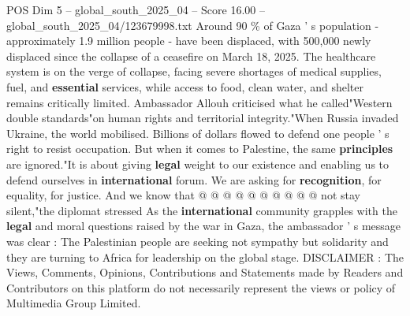 \begin{textsample}{POS Dim 5 – global\_south\_2025\_04 – Score 16.00 – global\_south\_2025\_04/123679998.txt}
Around 90 \% of Gaza ' s population - approximately 1.9 million people - have been displaced, with 500,000 newly displaced since the collapse of a ceasefire on March 18, 2025.
The healthcare system is on the verge of collapse, facing severe shortages of medical supplies, fuel, and \textbf{essential} services, while access to food, clean water, and shelter remains critically limited.
Ambassador Allouh criticised what he called"Western double standards"on human rights and territorial integrity."When Russia invaded Ukraine, the world mobilised.
Billions of dollars flowed to defend one people ' s right to resist occupation.
But when it comes to Palestine, the same \textbf{principles} are ignored."It is about giving \textbf{legal} weight to our existence and enabling us to defend ourselves in \textbf{international} forum.
We are asking for \textbf{recognition}, for equality, for justice.
And we know that @ @ @ @ @ @ @ @ @ @ not stay silent,"the diplomat stressed As the \textbf{international} community grapples with the \textbf{legal} and moral questions raised by the war in Gaza, the ambassador ' s message was clear : The Palestinian people are seeking not sympathy but solidarity and they are turning to Africa for leadership on the global stage.
DISCLAIMER : The Views, Comments, Opinions, Contributions and Statements made by Readers and Contributors on this platform do not necessarily represent the views or policy of Multimedia Group Limited.

\end{textsample}
